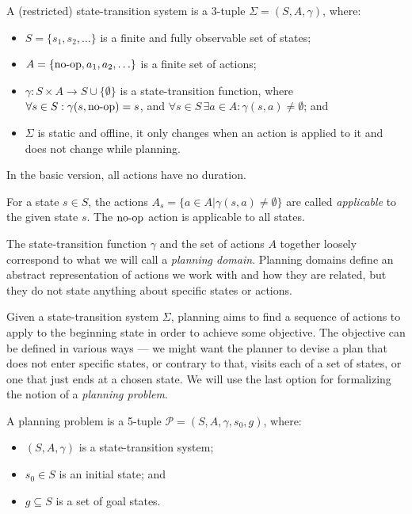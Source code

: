 \begin{defn}\label{defn:state-transition-sys}
A (restricted) state-transition system is a 3-tuple $\Sigma = (S, A, \gamma)$, where:
\begin{itemize}
\item $S = \{s_1, s_2, \ldots\}$ is a finite and fully observable set of states;
\item $A = \{\operatorname{\textrm{no-op}}, a_1, a_2, \ldots\}$ is a finite set of actions;
\item $\gamma: S \times A \to S \cup \{\emptyset\}$ is a state-transition function,
where $\forall s \in S : \gamma(s, \operatorname{\textrm{no-op}}) = s$,
and $\forall s \in S\,\exists a \in A : \gamma(s, a) \neq \emptyset$; and
\item $\Sigma$ is static and offline,
it only changes when an action is applied to it and does not change while planning.
\end{itemize}
In the basic version, all actions have no duration.
\end{defn}

For a state $s \in S$, the actions $A_s = \{a \in A | \gamma(s, a) \neq \emptyset\}$ are called \textit{applicable}
to the given state $s$. The $\operatorname{\textrm{no-op}}$ action is applicable to all states.

The state-transition function $\gamma$ and the set of actions $A$ together loosely correspond to what we will call a \textit{planning domain}.
Planning domains define an abstract representation of actions we work with
and how they are related,
but they do not state anything about specific states or actions.

Given a state-transition system $\Sigma$, planning aims to find a
sequence of actions to apply to the beginning state in order to achieve some objective.
The objective can be defined in various ways --- we might want the planner
to devise a plan that
does not enter specific states, or contrary to that, visits each of a set of states,
or one that just ends at a chosen state.
We will use the last option for formalizing the notion of a \textit{planning problem}.

\begin{defn}\label{defn:planning-problem}\citep[Part~I]{Ghallab2004}
A planning problem is a 5-tuple $\mathcal{P} = (S, A, \gamma, s_0, g)$, where:
\begin{itemize}
\item $(S, A, \gamma)$ is a state-transition system;
\item $s_0 \in S$ is an initial state; and
\item $g \subseteq S$ is a set of goal states.
\end{itemize}
\end{defn}

